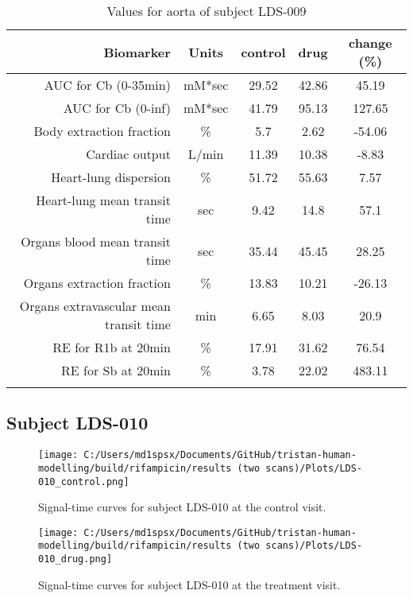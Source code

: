 \documentclass{epflreport}%
\begin{document}
\begin{longtable}{rcccc}%
\hline%
Biomarker&Units&control&drug&change (\%)\\%
\hline%
AUC for Cb (0{-}35min)&mM*sec&29.52&42.86&45.19\\%
AUC for Cb (0{-}inf)&mM*sec&41.79&95.13&127.65\\%
Body extraction fraction&\%&5.7&2.62&{-}54.06\\%
Cardiac output&L/min&11.39&10.38&{-}8.83\\%
Heart{-}lung dispersion&\%&51.72&55.63&7.57\\%
Heart{-}lung mean transit time&sec&9.42&14.8&57.1\\%
Organs blood mean transit time&sec&35.44&45.45&28.25\\%
Organs extraction fraction&\%&13.83&10.21&{-}26.13\\%
Organs extravascular mean transit time&min&6.65&8.03&20.9\\%
RE for R1b at 20min&\%&17.91&31.62&76.54\\%
RE for Sb at 20min&\%&3.78&22.02&483.11\\%
\hline%
\caption{Values for aorta of subject LDS-009} \\%
\end{longtable}%
\clearpage%
\subsection{Subject LDS{-}010}%
\label{subsec:SubjectLDS{-}010}%

%


\begin{figure}[h!]%
\centering%
\texttt{[image: C:/Users/md1spsx/Documents/GitHub/tristan-human-modelling/build/rifampicin/results (two scans)/Plots/LDS-010\_control.png]}%
\caption{Signal{-}time curves for subject LDS{-}010 at the control visit.}%
\end{figure}

%


\begin{figure}[h!]%
\centering%
\texttt{[image: C:/Users/md1spsx/Documents/GitHub/tristan-human-modelling/build/rifampicin/results (two scans)/Plots/LDS-010\_drug.png]}%
\caption{Signal{-}time curves for subject LDS{-}010 at the treatment visit.}%
\end{figure}
\end{document}
